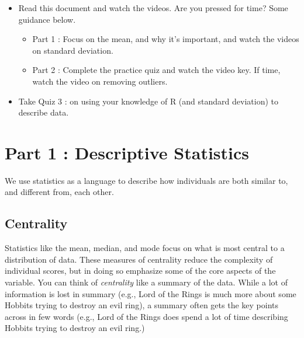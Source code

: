 \documentclass[
  letterpaper,
  DIV=11,
  numbers=noendperiod,
  oneside]{scrreprt}
\providecommand{\tightlist}{%
  \setlength{\itemsep}{0pt}\setlength{\parskip}{0pt}}\usepackage{longtable,booktabs,array}
\begin{document}
\begin{tcolorbox}[enhanced jigsaw, toptitle=1mm, toprule=.15mm, rightrule=.15mm, breakable, left=2mm, colbacktitle=quarto-callout-important-color!10!white, colback=white, opacityback=0, coltitle=black, bottomtitle=1mm, opacitybacktitle=0.6, titlerule=0mm, leftrule=.75mm, arc=.35mm, bottomrule=.15mm, title=\textcolor{quarto-callout-important-color}{\faExclamation}\hspace{0.5em}{To-Do List:}, colframe=quarto-callout-important-color-frame]

\begin{itemize}
\tightlist
\item
  Read this document and watch the videos. Are you pressed for time?
  Some guidance below.

  \begin{itemize}
  \tightlist
  \item
    Part 1 : Focus on the mean, and why it's important, and watch the
    videos on standard deviation.
  \item
    Part 2 : Complete the practice quiz and watch the video key. If
    time, watch the video on removing outliers.
  \end{itemize}
\item
  Take Quiz 3 : on using your knowledge of R (and standard deviation) to
  describe data.
\end{itemize}

\end{tcolorbox}

\chapter{Part 1 : Descriptive
Statistics}\label{part-1-descriptive-statistics}

We use statistics as a language to describe how individuals are both
similar to, and different from, each other.

\section{Centrality}\label{centrality}

Statistics like the mean, median, and mode focus on what is most central
to a distribution of data. These measures of centrality reduce the
complexity of individual scores, but in doing so emphasize some of the
core aspects of the variable. You can think of \emph{centrality} like a
summary of the data. While a lot of information is lost in summary
(e.g., Lord of the Rings is much more about some Hobbits trying to
destroy an evil ring), a summary often gets the key points across in few
words (e.g., Lord of the Rings does spend a lot of time describing
Hobbits trying to destroy an evil ring.)
\end{document}
